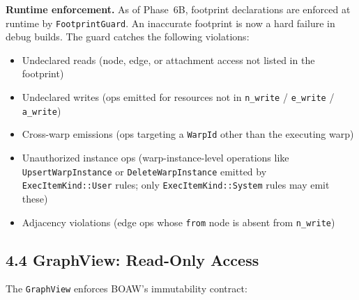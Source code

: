 \documentclass[
  11pt,
]{book}
\begin{document}
\textbf{Runtime enforcement.} As of Phase~6B, footprint declarations are
enforced at runtime by \texttt{FootprintGuard}. An inaccurate footprint is
now a hard failure in debug builds. The guard catches the following
violations:

\begin{itemize}
\item Undeclared reads (node, edge, or attachment access not listed in the footprint)
\item Undeclared writes (ops emitted for resources not in \texttt{n\_write} / \texttt{e\_write} / \texttt{a\_write})
\item Cross-warp emissions (ops targeting a \texttt{WarpId} other than the executing warp)
\item Unauthorized instance ops (warp-instance-level operations like \texttt{UpsertWarpInstance} or
  \texttt{DeleteWarpInstance} emitted by \texttt{ExecItemKind::User} rules; only
  \texttt{ExecItemKind::System} rules may emit these)
\item Adjacency violations (edge ops whose \texttt{from} node is absent from \texttt{n\_write})
\end{itemize}

\subsection{4.4 GraphView: Read-Only
Access}\label{graphview-read-only-access}

The \texttt{GraphView} enforces BOAW's immutability contract:
\end{document}
